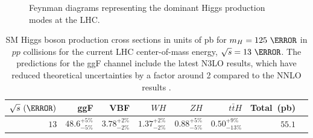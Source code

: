 \begin{figure}[!htbp]
{{\begin{tikzpicture}[thick]
\end{tikzpicture}
}}

\caption{Feynman diagrams representing the dominant Higgs production modes at
the LHC.}

\label{fig:higgs_production}
\end{figure}

\begin{table}[htpb]
 \centering
 \caption{ SM Higgs boson production cross sections in units of pb for
$m_{H}=125~\GeV$ in $pp$ collisions for the current LHC center-of-mass energy,
$\sqrt{s} = 13~\TeV$.  The predictions for the ggF channel include the latest
N3LO results, which have reduced theoretical uncertainties by a factor around 2
compared to the NNLO results \cite{PDG2018:Ch11}.}
 \begin{tabular}{@{}rrrrrrrr@{}} \toprule
  $\sqrt{s}~(\TeV)$ & ggF                  & VBF                  & $WH$                 & $ZH$                 & $t\bar{t}H$            & Total~(pb) \\ \midrule
  $13$              & $48.6_{-5\%}^{+5\%}$ & $3.78_{-2\%}^{+2\%}$ & $1.37_{-2\%}^{+2\%}$ & $0.88_{-5\%}^{+5\%}$ & $0.50_{-13\%}^{+9\%}$ &  $55.1$    \\
  \bottomrule
 \end{tabular}\label{table:higgs_production_xsection}
\end{table}

